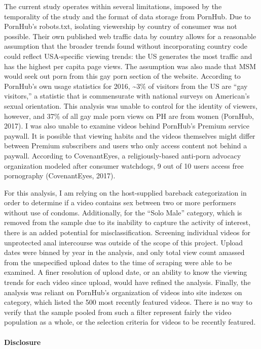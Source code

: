\documentclass[]{article}
\let\oldparagraph\paragraph
\renewcommand{\paragraph}[1]{\oldparagraph{#1}\mbox{}}
\begin{document}
The current study operates within several limitations, imposed by the
temporality of the study and the format of data storage from PornHub.
Due to PornHub's robots.txt, isolating viewership by country of consumer
was not possible. Their own published web traffic data by country allows
for a reasonable assumption that the broader trends found without
incorporating country code could reflect USA-specific viewing trends:
the US generates the most traffic and has the highest per capita page
views. The assumption was also made that MSM would seek out porn from
this gay porn section of the website. According to PornHub's own usage
statistics for 2016, \textasciitilde{}3\% of visitors from the US are
``gay visitors,'' a statistic that is commensurate with national surveys
on American's sexual orientation. This analysis was unable to control
for the identity of viewers, however, and 37\% of all gay male porn
views on PH are from women (PornHub, 2017). I was also unable to examine
videos behind PornHub's Premium service paywall. It is possible that
viewing habits and the videos themselves might differ between Premium
subscribers and users who only access content not behind a paywall.
According to CovenantEyes, a religiously-based anti-porn advocacy
organization modeled after consumer watchdogs, 9 out of 10 users access
free pornography (CovenantEyes, 2017).

For this analysis, I am relying on the host-supplied bareback
categorization in order to determine if a video contains sex between two
or more performers without use of condoms. Additionally, for the ``Solo
Male'' category, which is removed from the sample due to its inability
to capture the activity of interest, there is an added potential for
misclassification. Screening individual videos for unprotected anal
intercourse was outside of the scope of this project. Upload dates were
binned by year in the analysis, and only total view count amassed from
the unspecified upload dates to the time of scraping were able to be
examined. A finer resolution of upload date, or an ability to know the
viewing trends for each video since upload, would have refined the
analysis. Finally, the analysis was reliant on PornHub's organization of
videos into site indexes on category, which listed the 500 most recently
featured videos. There is no way to verify that the sample pooled from
such a filter represent fairly the video population as a whole, or the
selection criteria for videos to be recently featured.

\paragraph{Disclosure}\label{disclosure}
\end{document}

